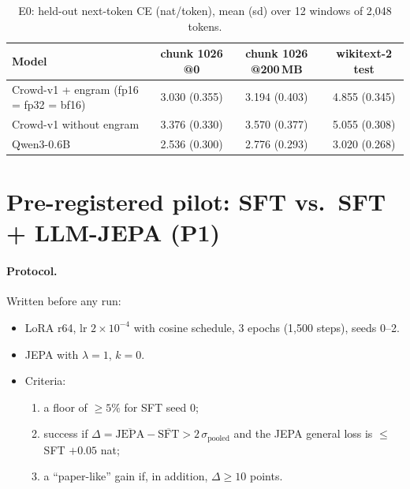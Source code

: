 \documentclass[11pt]{article}
\begin{document}
\begin{table}[t]
\centering
\caption{E0: held-out next-token CE (nat/token), mean (sd) over 12 windows of 2{,}048 tokens.}
\label{tab:e0}
\small
\begin{tabular}{lccc}
\toprule
Model & chunk 1026 @0 & chunk 1026 @200\,MB & wikitext-2 test\\
\midrule
Crowd-v1 + engram (fp16 = fp32 = bf16) & 3.030 (0.355) & 3.194 (0.403) & 4.855 (0.345)\\
Crowd-v1 without engram & 3.376 (0.330) & 3.570 (0.377) & 5.055 (0.308)\\
Qwen3-0.6B & 2.536 (0.300) & 2.776 (0.293) & 3.020 (0.268)\\
\bottomrule
\end{tabular}
\end{table}

\section{Pre-registered pilot: SFT vs.\ SFT + LLM-JEPA (P1)}
\label{sec:p1}
\paragraph{Protocol.} Written before any run:
\begin{itemize}
\item LoRA r64, lr $2\times10^{-4}$ with cosine schedule, 3 epochs (1{,}500 steps), seeds 0--2.
\item JEPA with $\lambda=1$, $k=0$.
\item Criteria:
  \begin{enumerate}
  \item a floor of $\ge5\%$ for SFT seed 0;
  \item success if $\Delta=\overline{\text{JEPA}}-\overline{\text{SFT}}>2\,\sigma_{\text{pooled}}$ and the JEPA general loss
  is $\le$ SFT $+0.05$ nat;
  \item a ``paper-like'' gain if, in addition, $\Delta\ge10$ points.
  \end{enumerate}
\end{itemize}
\end{document}
